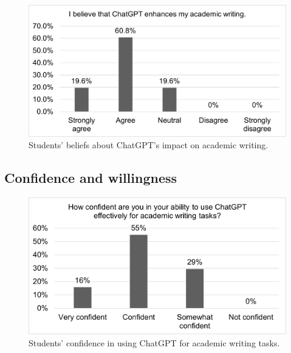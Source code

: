 \documentclass[english]{textolivre}
\begin{document}
\begin{figure}[h!]
    \centering
    \begin{minipage}{0.80\linewidth}
    \includegraphics[width=\linewidth]{Imagens/FIGURA7.png}
    \caption{Students’ beliefs about ChatGPT’s impact on academic writing.}
    \label{fig-7}
    \end{minipage}
\end{figure}

\subsection{Confidence and willingness}

\begin{figure}[h!]
    \centering
    \begin{minipage}{0.80\linewidth}
    \includegraphics[width=\linewidth]{Imagens/FIGURA8.png}
    \caption{Students’ confidence in using ChatGPT for academic writing tasks.}
    \label{fig-8}
    \end{minipage}
\end{figure}
\end{document}
